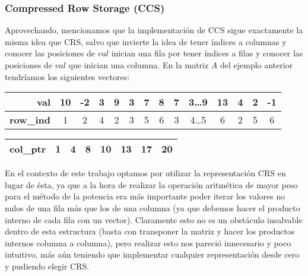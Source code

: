 \subsubsection{Compressed Row Storage (CCS)}
\par Aprovechando, mencionamos que la implementaci\'on de CCS sigue exactamente
la misma idea que CRS, salvo que invierte la idea de tener \'indices a columnas
y conocer las posiciones de $val$ inician una fila por tener \'indices a filas y
conocer las posiciones de $val$ que inician una columna. En la matriz $A$ del
ejemplo anterior tendr\'iamos los siguientes vectores\cite{netlib_ccs}:

\begin{table}[!h]
    \begin{tabular}{|r|c|c|c|c|c|c|c|c|c|c|c|c|c|}
        \hline
        \textbf{val}&10&-2&3&9&3&7&8&7&3\dots 9&13&4&2&-1\\
        \hline
        \textbf{row\_ind}&1&2&4&2&3&5&6&3&4\dots 5&6&2&5&6\\
        \hline
    \end{tabular}
    \begin{tabular}{|r|c|c|c|c|c|c|c|}
        \hline
        \textbf{col\_ptr}&1&4&8&10&13&17&20\\
        \hline
    \end{tabular}
\end{table}

\par En el contexto de este trabajo optamos por utilizar la representaci\'on CRS
en lugar de \'esta, ya que a la hora de realizar la operaci\'on aritm\'etica de
mayor peso para el m\'etodo de la potencia era m\'as importante poder iterar los
valores no nulos de una fila m\'as que los de una columna (ya que debemos hacer
el producto interno de cada fila con un vector). Claramente esto no es un
obst\'aculo insalvable dentro de esta estructura (basta con transponer la
matriz y hacer los productos internos columna a columna), pero realizar esto nos
pareci\'o innecesario y poco intuitivo, m\'as a\'un teniendo que implementar
cualquier representaci\'on desde cero y pudiendo elegir CRS.

